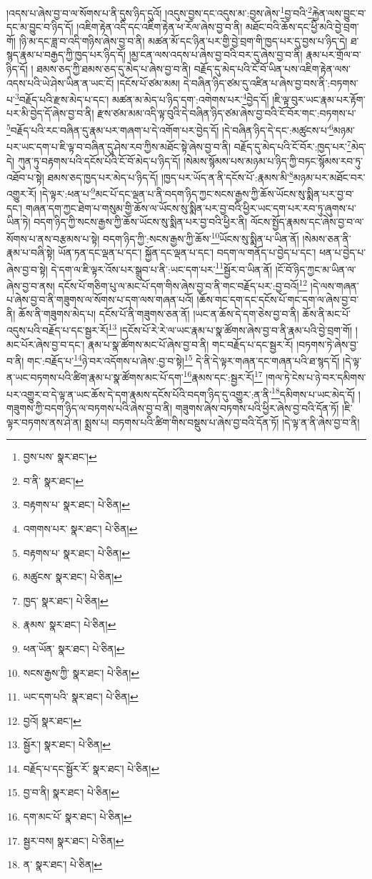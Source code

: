 །འདས་པ་ཞེས་བྱ་བ་ལ་སོགས་པ་ནི་དུས་ཉིད་དུའོ། །འདུས་བྱས་དང་འདུས་མ་:བྱས་ཞེས་\footnote{བྱས་པས་  སྣར་ཐང་། }བྱ་བའི་\footnote{བ་ནི་  སྣར་ཐང་། }རྐྱེན་ལས་བྱུང་བ་དང་མ་བྱུང་བ་ཉིད་དོ། །འཇིག་རྟེན་འདི་དང་འཇིག་རྟེན་ཕ་རོལ་ཞེས་བྱ་བ་ནི། མཐོང་བའི་ཆོས་དང་ཕྱི་མའི་བྱེ་བྲག་གོ། །ཉི་མ་དང་ཟླ་བ་འདི་གཉིས་ཞེས་བྱ་བ་ནི། མཚན་མོ་དང་ཉིན་པར་གྱི་བྱེ་བྲག་གི་ཁྱད་པར་དུ་བྱས་པ་ཉིད་དེ། ཐ་སྙད་རྣམ་པ་བརྒྱད་ཀྱི་ཁྱད་པར་ཉིད་དོ། །མྱ་ངན་ལས་འདས་པ་ཞེས་བྱ་བའི་བར་དུ་ཞེས་བྱ་བ་ནི། རྣམ་པར་གྲོལ་བ་ཉིད་དོ། །
ཐམས་ཅད་ཀྱི་ཐམས་ཅད་དུ་མེད་པ་ཞེས་བྱ་བ་ནི། བརྗོད་དུ་མེད་པའི་ངོ་བོ་ཡིན་པས་འཇིག་རྟེན་ལས་འདས་པའི་ཡེ་ཤེས་ཡིན་ན་ཡང་ངོ། །དངོས་པོ་ཙམ་མམ། དེ་བཞིན་ཉིད་ཙམ་དུ་འཛིན་པ་ཞེས་བྱ་བས་ནི་:བཏགས་པ་\footnote{བརྟགས་པ་  སྣར་ཐང་།  པེ་ཅིན། }བརྗོད་པའི་རྫས་མེད་པ་དང་། མཚན་མ་མེད་པ་ཉིད་དག་:འགེགས་པར་\footnote{འགགས་པར་  སྣར་ཐང་།  པེ་ཅིན། }བྱེད་དོ། །ཇི་ལྟ་བུར་ཡང་རྣམ་པར་རྟོག་པར་མི་བྱེད་དོ་ཞེས་བྱ་བ་ནི། རྫས་ཙམ་མམ་འདི་ལྟ་བུའི་དེ་བཞིན་ཉིད་ཙམ་ཞེས་བྱ་བའི་ངོ་བོར་གང་:བཏགས་པ་\footnote{བརྟགས་པ་  སྣར་ཐང་།  པེ་ཅིན། }བརྗོད་པའི་རང་བཞིན་དུ་རྣམ་པར་གཞག་པ་དེ་འགོག་པར་བྱེད་དོ། །དེ་བཞིན་ཉིད་དེ་དང་:མཚུངས་པ་\footnote{མཚུངས་  སྣར་ཐང་།  པེ་ཅིན། }མཉམ་པར་ཡང་དག་པ་ཇི་ལྟ་བ་བཞིན་དུ་ཤེས་རབ་ཀྱིས་མཐོང་སྟེ་ཞེས་བྱ་བ་ནི། བརྗོད་དུ་མེད་པའི་ངོ་བོར་:ཁྱད་པར་\footnote{ཁྱད་  སྣར་ཐང་།  པེ་ཅིན། }མེད་དེ། ཀུན་ཏུ་བརྟགས་པའི་དངོས་པོའི་ངོ་བོ་མེད་པ་ཉིད་དོ། །སེམས་སྙོམས་པས་མཉམ་པ་ཉིད་ཀྱི་བཏང་སྙོམས་རབ་ཏུ་འཐོབ་པ་སྟེ། ཐམས་ཅད་ཁྱད་པར་མེད་པ་ཉིད་དོ། །ཁྱད་པར་ཡོད་ན་ནི་དངོས་པོ་:རྣམས་མི་\footnote{རྣམས་  སྣར་ཐང་།  པེ་ཅིན། }མཉམ་པར་མཐོང་བར་འགྱུར་རོ། །དེ་ལྟར་:ཕན་པ་\footnote{ཕན་ཡོན་  སྣར་ཐང་།  པེ་ཅིན། }མང་པོ་དང་ལྡན་པ་ནི་བདག་ཉིད་ཀྱང་སངས་རྒྱས་ཀྱི་ཆོས་ཡོངས་སུ་སྨིན་པར་བྱ་བ་དང་། གཞན་དག་ཀྱང་ཐེག་པ་གསུམ་གྱི་ཆོས་ལ་ཡོངས་སུ་སྨིན་པར་བྱ་བའི་ཕྱིར་ཡང་དག་པར་རབ་ཏུ་ཞུགས་པ་ཡིན་ཏེ། བདག་ཉིད་ཀྱི་སངས་རྒྱས་ཀྱི་ཆོས་ཡོངས་སུ་སྨིན་པར་བྱ་བའི་ཕྱིར་ནི། ལོངས་སྤྱོད་རྣམས་དང་ཞེས་བྱ་བ་ལ་སོགས་པ་ནས་བརྩམས་པ་སྟེ། བདག་ཉིད་ཀྱི་:སངས་རྒྱས་ཀྱི་ཆོས་\footnote{སངས་རྒྱས་ཀྱི་  སྣར་ཐང་།  པེ་ཅིན། }ཡོངས་སུ་སྨིན་པ་ཡིན་ནོ། །སེམས་ཅན་ནི་རྣམ་པ་བཞི་སྟེ། ཡོན་ཏན་དང་ལྡན་པ་དང་། སྐྱོན་དང་ལྡན་པ་དང་། བདག་ལ་གནོད་པ་བྱེད་པ་དང་། ཕན་པ་བྱེད་པ་ཞེས་བྱ་བ་སྟེ། དེ་དག་ལ་ཇི་ལྟར་འོས་པར་སྒྲུབ་པ་ནི་:ཡང་དག་པར་\footnote{ཡང་དག་པའི་  སྣར་ཐང་།  པེ་ཅིན། }སྦྱོར་བ་ཡིན་ནོ། །ངོ་བོ་ཉིད་ཀྱང་མ་ཡིན་ལ་ཞེས་བྱ་བ་ནས། དངོས་པོ་གཅིག་པུ་ལ་མང་པོ་དག་གིས་ཞེས་བྱ་བ་ནི་གང་བརྗོད་པར་:བྱ་བའོ།\footnote{བྱའོ།  སྣར་ཐང་། } །དེ་ལས་གཞན་པ་ཞེས་བྱ་བ་ནི་གཟུགས་ལ་སོགས་པ་དག་ལས་གཞན་པའོ། །ཆོས་གང་དག་དང་དངོས་པོ་གང་དག་ལ་ཞེས་བྱ་བ་ནི། ཆོས་ནི་གཟུགས་མེད་པ། དངོས་པོ་ནི་གཟུགས་ཅན་ནོ། །ཡང་ན་ཆོས་དེ་དག་ཅེས་བྱ་བ་ནི། ཆོས་ནི་མང་པོ་འདུས་པའི་བརྗོད་པ་དང་སྦྱར་རོ།\footnote{སྦྱོར་།  སྣར་ཐང་།  པེ་ཅིན། } །དངོས་པོ་རེ་རེ་ལ་ཡང་རྣམ་པ་སྣ་ཚོགས་ཞེས་བྱ་བ་ནི་རྣམ་པའི་བྱེ་བྲག་གོ། །མང་པོར་ཞེས་བྱ་བ་དང་། རྣམ་པ་སྣ་ཚོགས་མང་པོ་ཞེས་བྱ་བ་ནི། གང་བརྗོད་པ་དང་སྦྱར་རོ། །བཏགས་ཏེ་ཞེས་བྱ་བ་ནི། གང་:བརྗོད་པ་\footnote{བརྗོད་པ་དང་སྦྱོར་རོ་  སྣར་ཐང་།  པེ་ཅིན། }ཉེ་བར་འདོགས་པ་ཞེས་:བྱ་བ་སྟེ།\footnote{བྱ་བ་ནི།  སྣར་ཐང་།  པེ་ཅིན། } དེ་ནི་དེ་ལྟར་གཞན་དང་གཞན་པའི་ཐ་སྙད་དོ། །དེ་ལྟ་ན་ཡང་བཏགས་པའི་ཚིག་རྣམ་པ་སྣ་ཚོགས་མང་པོ་དག་\footnote{དག་མང་པོ་  སྣར་ཐང་།  པེ་ཅིན། }རྣམས་དང་:སྦྱར་རོ།\footnote{སྦྱར་བས།  སྣར་ཐང་།  པེ་ཅིན། } །གལ་ཏེ་ངེས་པ་ཉེ་བར་དམིགས་པར་འགྱུར་བ་དེ་ལྟ་ན་ཡང་ཆོས་དེ་དག་རྣམས་དངོས་པོའི་བདག་ཉིད་དུ་འགྱུར་:ན་ནི་\footnote{ན་  སྣར་ཐང་།  པེ་ཅིན། }དམིགས་པ་ཡང་མེད་དོ། །གཟུགས་ཀྱི་བདག་ཉིད་ལ་བཏགས་པའི་ཞེས་བྱ་བ་ནི། གཟུགས་ཞེས་བཏགས་པའི་ཕྱིར་ཞེས་བྱ་བའི་དོན་ཏོ། །ཇི་ལྟར་བཏགས་ནས་ཤེ་ན། སྨྲས་པ། བཏགས་པའི་ཚིག་གིས་བསྡུས་པ་ཞེས་བྱ་བའི་དོན་ཏོ། །དེ་ལྟ་ན་ནི་ཞེས་བྱ་བ་ནི། 